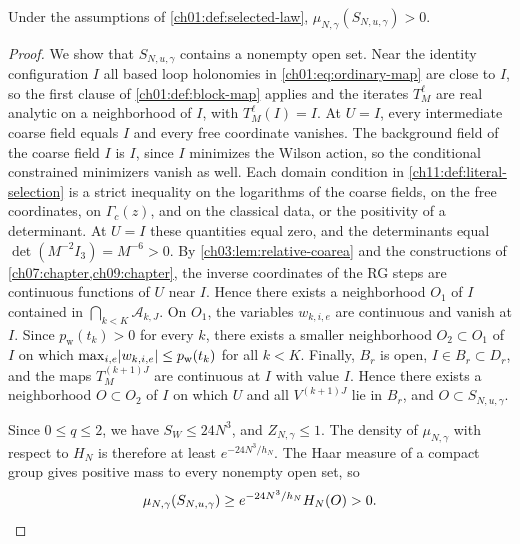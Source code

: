\begin{lemma}\label{ch01:lem:positive-mass}
Under the assumptions of \cref{ch01:def:selected-law}, $\mu_{N,\gamma}(S_{N,u,\gamma})>0$.
\end{lemma}

\begin{proof}
We show that $S_{N,u,\gamma}$ contains a nonempty open set. Near the identity configuration $I$ all based loop holonomies in \eqref{ch01:eq:ordinary-map} are close to $I$, so the first clause of \cref{ch01:def:block-map} applies and the iterates $T_M^\ell$ are real analytic on a neighborhood of $I$, with $T_M^\ell(I)=I$. At $U=I$, every intermediate coarse field equals $I$ and every free coordinate vanishes. The background field of the coarse field $I$ is $I$, since $I$ minimizes the Wilson action, so the conditional constrained minimizers vanish as well. Each domain condition in \cref{ch11:def:literal-selection} is a strict inequality on the logarithms of the coarse fields, on the free coordinates, on $\Gamma_c(z)$, and on the classical data, or the positivity of a determinant. At $U=I$ these quantities equal zero, and the determinants equal $\det(M^{-2}I_3)=M^{-6}>0$. By \cref{ch03:lem:relative-coarea} and the constructions of \cref{ch07:chapter,ch09:chapter}, the inverse coordinates of the RG steps are continuous functions of $U$ near $I$. Hence there exists a neighborhood $O_1$ of $I$ contained in $\bigcap_{k<K}\mathcal A_{k,J}$. On $O_1$, the variables $w_{k,i,e}$ are continuous and vanish at $I$. Since $p_{\mathrm w}(t_k)>0$ for every $k$, there exists a smaller neighborhood $O_2\subset O_1$ of $I$ on which $\max_{i,e}\lvert w_{k,i,e}\rvert\le p_{\mathrm w}(t_k)$ for all $k<K$. Finally, $B_r$ is open, $I\in B_r\subset D_r$, and the maps $T_M^{(k+1)J}$ are continuous at $I$ with value $I$. Hence there exists a neighborhood $O\subset O_2$ of $I$ on which $U$ and all $V^{(k+1)J}$ lie in $B_r$, and $O\subset S_{N,u,\gamma}$.

Since $0\le q\le2$, we have $S_W\le24N^3$, and $Z_{N,\gamma}\le1$. The density of $\mu_{N,\gamma}$ with respect to $H_N$ is therefore at least $e^{-24N^3/h_N}$. The Haar measure of a compact group gives positive mass to every nonempty open set, so
\[
 \mu_{N,\gamma}(S_{N,u,\gamma})\ge e^{-24N^3/h_N}H_N(O)>0.\qedhere
\]
\end{proof}

